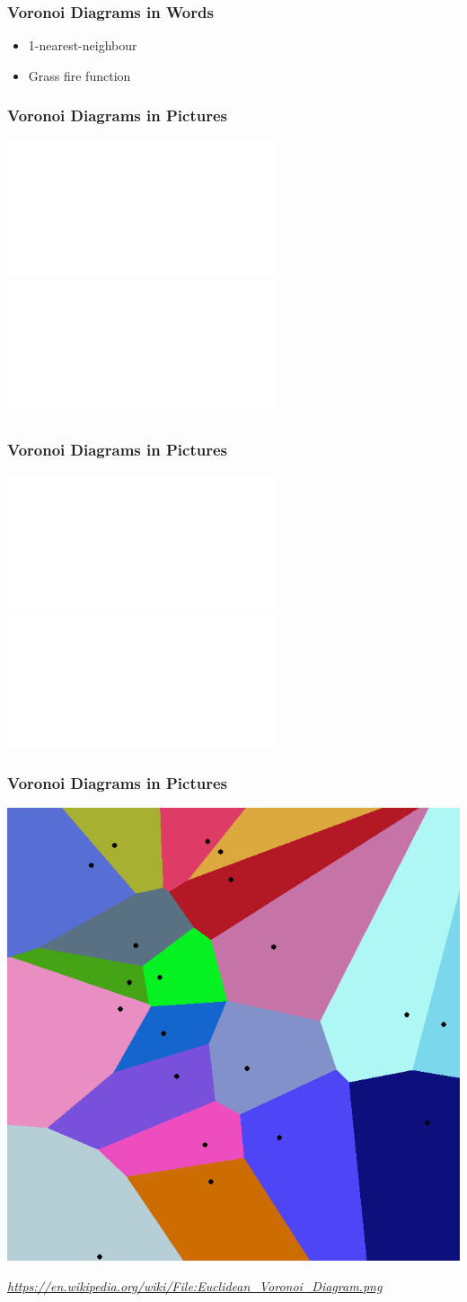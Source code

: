 \documentclass{beamer}
\newcommand\smallgray[1]{\textcolor{gray}{\small\it #1}}
\begin{document}
\begin{frame}
  \frametitle{Voronoi Diagrams in Words}

  \begin{itemize}
  \item 1-nearest-neighbour
  \item Grass fire function
  \end{itemize}
\end{frame}

\begin{frame}
  \frametitle{Voronoi Diagrams in Pictures}
  \includegraphics<1>[width=.8\textwidth]{voronoi-2a.pdf}
  \includegraphics<2>[width=.8\textwidth]{voronoi-2b.pdf}
\end{frame}

\begin{frame}
  \frametitle{Voronoi Diagrams in Pictures}
  \includegraphics<1>[width=.8\textwidth]{voronoi-circle-a.pdf}
  \includegraphics<2>[width=.8\textwidth]{voronoi-circle-b.pdf}
\end{frame}

\begin{frame}
  \frametitle{Voronoi Diagrams in Pictures}

  \includegraphics[width=.6\textwidth]{Euclidean_Voronoi_Diagram.png}

  \smallgray{\url{https://en.wikipedia.org/wiki/File:Euclidean_Voronoi_Diagram.png}}
\end{frame}
\end{document}
